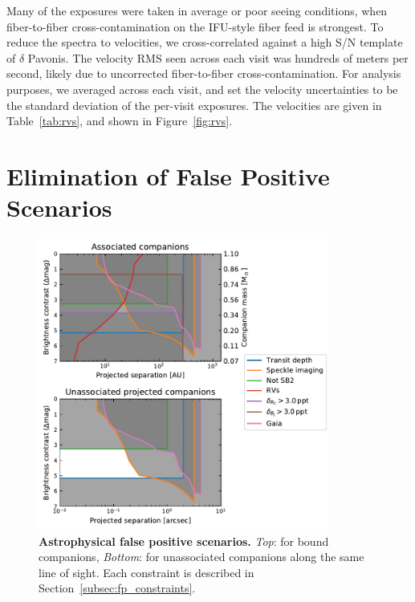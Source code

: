 \documentclass[12pt,twocolumn,tighten]{aastex63}
\begin{document}
Many of the exposures were taken in average or poor seeing conditions,
when fiber-to-fiber cross-contamination on the IFU-style fiber feed is
strongest.  To reduce the spectra to velocities, we cross-correlated
against a high S/N template of $\delta$ Pavonis.  The velocity RMS
seen across each visit was hundreds of meters per second, likely due to
uncorrected fiber-to-fiber cross-contamination.  For
analysis purposes, we averaged across each visit, and set the velocity
uncertainties to be the standard deviation of the per-visit exposures.
The velocities are given in Table~\ref{tab:rvs}, and shown in
Figure~\ref{fig:rvs}.



\section{Elimination of False Positive Scenarios}
\label{sec:validation}

\begin{figure}[!t]
	\begin{center}
		\leavevmode
		\includegraphics[width=0.85\textwidth]{f4.pdf}
	\end{center}
	\vspace{-0.7cm}
	\caption{
		{\bf Astrophysical false positive scenarios.}
		{\it Top}: for bound companions,
		{\it Bottom}: for unassociated companions along the same line of
		sight.
		Each constraint is described in Section~\ref{subsec:fp_constraints}.
		\label{fig:fpscenario}
	}
\end{figure}
\end{document}
